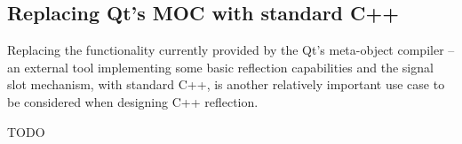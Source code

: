 \subsection{Replacing Qt's MOC with standard C++}
\label{use-case-replacing-moc}

Replacing the functionality currently provided by the Qt's meta-object
compiler -- an external tool implementing some basic reflection capabilities
and the signal slot mechanism, with standard C++, is another relatively important
use case to be considered when designing C++ reflection.

TODO
